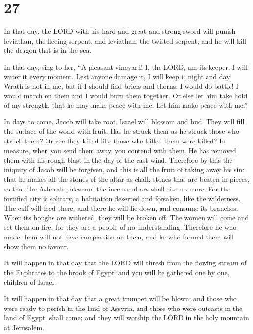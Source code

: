 \hypertarget{section-26}{%
\section{27}\label{section-26}}

 In that day, the LORD with his hard and great and strong
sword will punish leviathan, the fleeing serpent, and leviathan, the
twisted serpent; and he will kill the dragon that is in the sea.

 In that day, sing to her, ``A pleasant vineyard!
 I, the LORD, am its keeper. I will water it every moment.
Lest anyone damage it, I will keep it night and day. 
Wrath is not in me, but if I should find briers and thorns, I would do
battle! I would march on them and I would burn them together.
 Or else let him take hold of my strength, that he may
make peace with me. Let him make peace with me.''

 In days to come, Jacob will take root. Israel will
blossom and bud. They will fill the surface of the world with fruit.
 Has he struck them as he struck those who struck them? Or
are they killed like those who killed them were killed? 
In measure, when you send them away, you contend with them. He has
removed them with his rough blast in the day of the east wind.
 Therefore by this the iniquity of Jacob will be forgiven,
and this is all the fruit of taking away his sin: that he makes all the
stones of the altar as chalk stones that are beaten in pieces, so that
the Asherah poles and the incense altars shall rise no more.
 For the fortified city is solitary, a habitation
deserted and forsaken, like the wilderness. The calf will feed there,
and there he will lie down, and consume its branches. 
When its boughs are withered, they will be broken off. The women will
come and set them on fire, for they are a people of no understanding.
Therefore he who made them will not have compassion on them, and he who
formed them will show them no favour.

 It will happen in that day that the LORD will thresh
from the flowing stream of the Euphrates to the brook of Egypt; and you
will be gathered one by one, children of Israel.

 It will happen in that day that a great trumpet will be
blown; and those who were ready to perish in the land of Assyria, and
those who were outcasts in the land of Egypt, shall come; and they will
worship the LORD in the holy mountain at Jerusalem.

